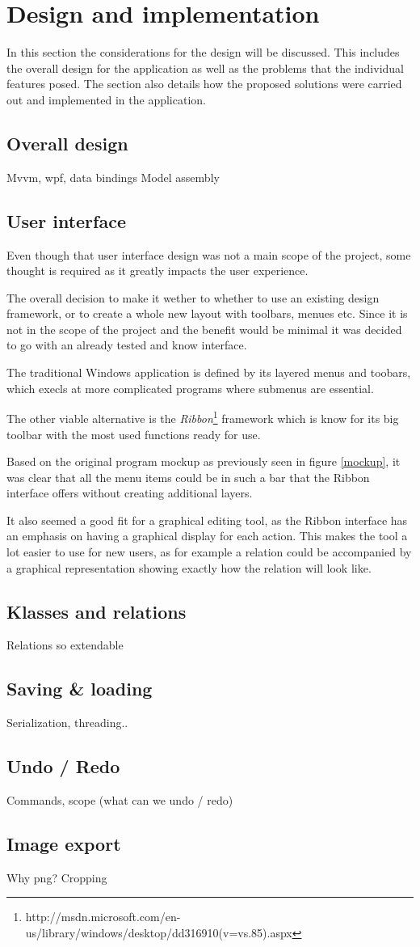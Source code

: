\section{Design and implementation}
In this section the considerations for the design will be discussed. This
includes the overall design for the application as well as the problems that the
individual features posed. The section also details how the proposed solutions
were carried out and implemented in the application.

\subsection{Overall design}
Mvvm, wpf, data bindings
Model assembly
\subsection{User interface}
Even though that user interface design was not a main scope of the project, some
thought is required as it greatly impacts the user experience. 

The overall decision to make it wether to whether to use an existing design
framework, or to create a whole new layout with toolbars, menues etc. Since it
is not in the scope of the project and the benefit would be minimal it was decided
to go with an already tested and know interface. 

The traditional Windows application is defined by its layered menus and
toobars,
which execls at more complicated programs where submenus are essential.

The other viable alternative is the \textit{Ribbon}\footnote{http://msdn.microsoft.com/en-us/library/windows/desktop/dd316910(v=vs.85).aspx} framework which is know for
its big toolbar with the most used functions ready for use.

Based on the original program mockup as previously seen in figure \ref{mockup},
it was clear that all the menu items could be in such a bar that the Ribbon
interface offers without creating additional layers.

It also seemed a good fit for a graphical editing tool, as the Ribbon interface
has an emphasis on having a graphical display for each action. This makes the
tool a lot easier to use for new users, as for example a relation could be
accompanied by a graphical representation showing exactly how the relation will
look like.

\subsection{Klasses and relations}
Relations so extendable

\subsection{Saving \& loading}
Serialization, threading..

\subsection{Undo / Redo}
Commands, scope (what can we undo / redo)
\subsection{Image export}
Why png? Cropping
